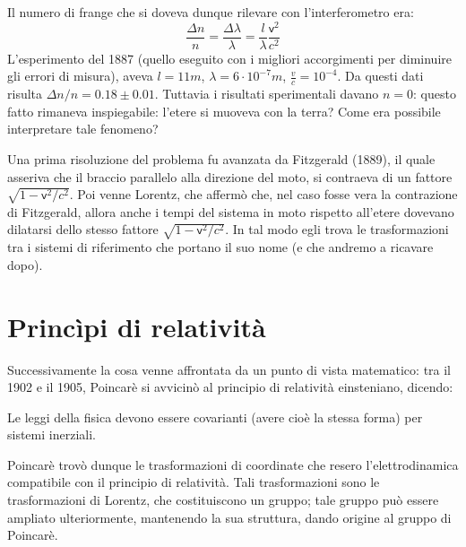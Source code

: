 Il numero di frange che si doveva dunque rilevare con l'interferometro
era:
\begin{displaymath}
  \frac{\Delta n}{n} = 
  \frac{\Delta\lambda}{\lambda}=\frac{l}{\lambda}\frac{\mathsf{v}^2}{c^2}
\end{displaymath}
L'esperimento del 1887 (quello eseguito con i migliori accorgimenti
per diminuire gli errori di misura), aveva $l=11m$,
$\lambda=6\cdot10^{-7}m$, $ \frac{v}{c}=10^{-4} $. Da questi dati
risulta $\Delta n / n =0.18 \pm 0.01$. Tuttavia i risultati
sperimentali davano $n = 0$: questo fatto rimaneva inspiegabile:
l'etere si muoveva con la terra? Come era possibile interpretare tale
fenomeno?
\begin{observazione} Una prima risoluzione del
  problema fu avanzata da Fitzgerald (1889), il quale asseriva che il
  braccio parallelo alla direzione del moto, si contraeva di un
  fattore $\sqrt{1-\mathsf{v}^2/c^2}$. Poi venne Lorentz, che
  afferm\`o che, nel caso fosse vera la contrazione di Fitzgerald,
  allora anche i tempi del sistema in moto rispetto all'etere dovevano
  dilatarsi dello stesso fattore $\sqrt{1-\mathsf{v}^2/c^2}$. In tal
  modo egli trova le trasformazioni tra i sistemi di riferimento che
  portano il suo nome (e che andremo a ricavare dopo).
\end{observazione}
\section{Princ\`ipi di relativit\`a}
Successivamente la cosa venne affrontata da un punto di vista
matematico: tra il 1902 e il 1905, Poincar\`e si avvicin\`o al
principio di relativit\`a einsteniano, dicendo:
\begin{principio}
  Le leggi della fisica devono essere covarianti (avere cio\`e la
  stessa forma) per sistemi inerziali.
\end{principio}
Poincar\`e trov\`o dunque le trasformazioni di coordinate che resero
l'elettrodinamica compatibile con il principio di relativit\`a. Tali
trasformazioni sono le trasformazioni di Lorentz, che costituiscono un
gruppo; tale gruppo pu\`o essere ampliato ulteriormente, mantenendo la
sua struttura, dando origine al gruppo di Poincar\`e.

